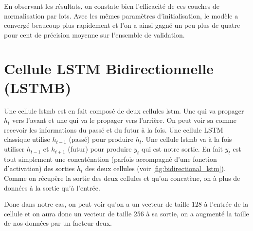 \begin{table}[H]
\end{table}

En observant les résultats, on constate bien l'efficacité de ces couches de normalisation par lots. Avec les mêmes paramètres d'initialisation, le modèle a convergé beaucoup plus rapidement et l’on a ainsi gagné un peu plus de quatre pour cent de précision moyenne sur l'ensemble de validation.

\section{Cellule LSTM Bidirectionnelle (LSTMB)}
\label{sec:5.6}

Une cellule \gls{lstmb} est en fait composé de deux cellules \gls{lstm}. Une qui va propager $h_t$ vers l'avant et une qui va le propager vers l'arrière. On peut voir sa comme recevoir les informations du passé et du futur à la fois. Une cellule LSTM classique utilise $h_{t-1}$ (passé) pour produire $h_t$. Une cellule \gls{lstmb} va à la fois utiliser $h_{t-1}$ et $h_{t+1}$ (futur) pour produire $y_t$ qui est notre sortie. En fait $y_t$ est tout simplement une concaténation (parfois accompagné d'une fonction d'activation) des sorties $h_t$ des deux cellules (voir \autoref{fig:bidirectional_lstm}). Comme on récupère la sortie des deux cellules et qu'on concatène, on à plus de données à la sortie qu'à l'entrée.

Donc dans notre cas, on peut voir qu'on a un vecteur de taille 128 à l'entrée de la cellule et on aura donc un vecteur de taille 256 à sa sortie, on a augmenté la taille de nos données par un facteur deux.


